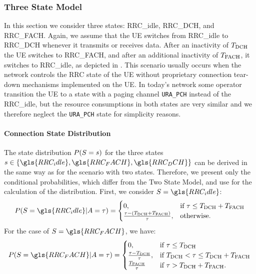 \subsubsection*{Three State Model}\label{sec:network:performance_model:analytical_model:three_states}
In this section we consider three states: \gls{RRC_idle}, \gls{RRC_DCH}, and \gls{RRC_FACH}.
Again, we assume that the \gls{UE} switches from \gls{RRC_idle} to \gls{RRC_DCH} whenever it transmits or receives data.
After an inactivity of \(T_{\text{DCH}}\) the \gls{UE} switches to \gls{RRC_FACH}, and after an additional inactivity of \(T_{\text{FACH}}\), it switches to \gls{RRC_idle}, as depicted in .
This scenario usually occurs when the network controls the \gls{RRC} state of the \gls{UE} without proprietary connection tear-down mechanisms implemented on the \gls{UE}.
In today's network some operator transition the \gls{UE} to a state with a paging channel \texttt{URA\_PCH} instead of the \gls{RRC_idle}, but the resource consumptions in both states are very similar and we therefore neglect the \texttt{URA\_PCH} state for simplicity reasons.

\paragraph*{Connection State Distribution}
The state distribution \(P(S=s)\) for the three states \(\RRCStateRealization\in\{\gls{RRC_idle},\gls{RRC_FACH},\gls{RRC_DCH}\}\) can be derived in the same way as for the scenario with two states.
Therefore, we present only the conditional probabilities, which differ from the Two State Model, and use  for the calculation of the distribution.
First, we consider \(\RRCState=\gls{RRC_idle}\):
\begin{equation*}
P(\RRCState=\gls{RRC_idle} \vert \PacketIAT = \ObservationIntervalLength) =
\begin{cases}
	0,  & \mbox{if } \ObservationIntervalLength \leq \TDCH+\TFACH \\
	\frac{\ObservationIntervalLength - (\TDCH+\TFACH)}{\ObservationIntervalLength},
	    & \mbox{otherwise.}
\end{cases}
\end{equation*}
For the case of \(\RRCState=\gls{RRC_FACH}\), we have:
\begin{equation*}
P(\RRCState=\gls{RRC_FACH} \vert \PacketIAT = \ObservationIntervalLength) =
\begin{cases}
	0,  & \mbox{if } \ObservationIntervalLength \leq \TDCH \\
	\frac{\ObservationIntervalLength - \TDCH}{\ObservationIntervalLength},
	    & \mbox{if }\TDCH<\ObservationIntervalLength\leq \TDCH+\TFACH \\
	\frac{\TFACH}{\ObservationIntervalLength}
	    & \mbox{if } \ObservationIntervalLength > \TDCH+\TFACH.
\end{cases}
\end{equation*}

